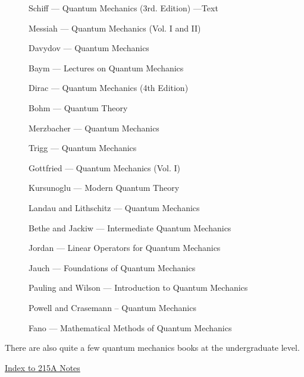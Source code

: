 \documentclass[epsf]{article}
\begin{document}
\begin{description}
\item[] Schiff  --- Quantum Mechanics (3rd. Edition) ---Text
\item[] Messiah --- Quantum Mechanics (Vol. I and II) 
\item[] Davydov --- Quantum Mechanics 
\item[] Baym    --- Lectures on Quantum Mechanics
\item[] Dirac   --- Quantum Mechanics (4th Edition)
\item[] Bohm    --- Quantum Theory
\item[] Merzbacher --- Quantum Mechanics
\item[] Trigg   --- Quantum Mechanics
\item[] Gottfried --- Quantum Mechanics (Vol. I)
\item[] Kursunoglu --- Modern Quantum Theory
\item[] Landau and Lithschitz --- Quantum Mechanics 
\item[] Bethe and Jackiw --- Intermediate Quantum Mechanics
\item[] Jordan --- Linear Operators for Quantum Mechanics
\item[] Jauch --- Foundations of Quantum Mechanics
\item[] Pauling and Wilson --- Introduction to Quantum Mechanics
\item[] Powell and Crasemann -- Quantum Mechanics
\item[] Fano --- Mathematical Methods of Quantum Mechanics
\end{description}

There are also quite a few quantum mechanics books at the undergraduate
level.

\newpage

\underline{Index to 215A Notes}

\tableofcontents
\end{document}
